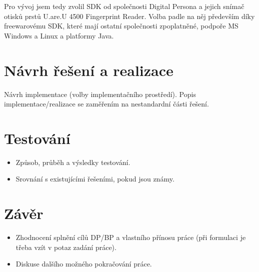 \documentclass[11pt,twoside,a4paper]{book}
\begin{document}
Pro vývoj jsem tedy zvolil SDK od společnosti Digital Persona a jejich snímač otisků prstů U.are.U 4500 Fingerprint Reader. Volba padle na něj především díky freewarovému SDK, které mají ostatní společnosti zpoplatněné, podpoře MS Windows a Linux a platformy Java.

\chapter{Návrh řešení a realizace}
Návrh implementace (volby implementačního prostředí).
Popis implementace/realizace se zaměřením na nestandardní části řešení.


\chapter{Testování}

\begin{itemize}
 \item Způsob, průběh a výsledky testování.
 \item Srovnání s existujícími řešeními, pokud jsou známy.
\end{itemize} 


\chapter{Závěr}

\begin{itemize}
\item Zhodnocení splnění cílů DP/BP a  vlastního přínosu práce (při formulaci je třeba vzít v potaz zadání práce).
\item Diskuse dalšího možného pokračování práce.
\end{itemize} 




%
%
%
%
\end{document}
